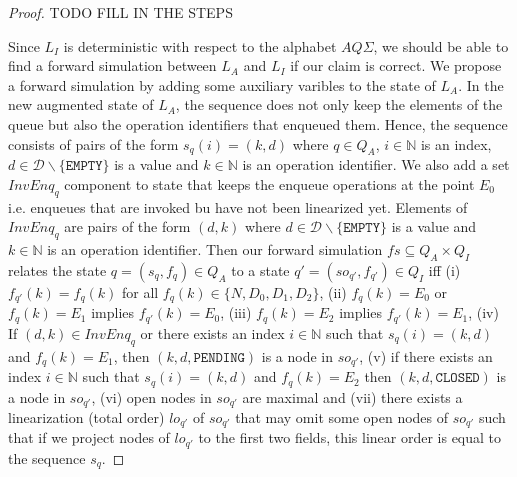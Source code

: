 \begin{proof}
TODO FILL IN THE STEPS



Since $L_I$ is deterministic with respect to the alphabet $AQ\Sigma$, we should be able to find a forward simulation between $L_A$ and $L_I$ if our claim is correct. We propose a forward simulation by adding some auxiliary varibles to the state of $L_A$. In the new augmented state of $L_A$, the sequence does not only keep the elements of the queue but also the operation identifiers that enqueued them. Hence, the sequence consists of  pairs of the form $s_q(i) = (k,d)$ where $q \in Q_A$, $i \in \mathbb{N}$ is an index, $d \in \mathcal{D}\backslash \{ \texttt{EMPTY} \}$ is a value and $k \in \mathbb{N}$ is an operation identifier. We also add a set $InvEnq_q$ component to state that keeps the enqueue operations at the point $E_0$ i.e. enqueues that are invoked bu have not been linearized yet. Elements of $InvEnq_q$ are pairs of the form $(d,k)$ where  $d \in \mathcal{D}\backslash \{ \texttt{EMPTY} \}$ is a value and $k \in \mathbb{N}$ is an operation identifier. Then our forward simulation $fs \subseteq Q_A \times Q_I$ relates the state $q = (s_q, f_q) \in Q_A$ to a state $q' =(so_{q'}, f_{q'}) \in Q_I$ iff (i) $f_{q'}(k) = f_q(k)$ for all $f_q(k) \in \{N, D_0, D_1, D_2\}$, (ii) $f_q(k) = E_0$ or $f_q(k) = E_1$ implies $f_{q'}(k) = E_0$, (iii) $f_q(k) = E_2$ implies $f_{q'}(k) = E_1$, (iv) If $(d,k) \in InvEnq_q$ or there exists an index $i \in \mathbb{N}$ such that $s_q(i) = (k,d)$ and $f_q(k) = E_1$, then $(k,d,\texttt{PENDING})$ is a node in $so_{q'}$, (v) if there exists an index $i \in \mathbb{N}$ such that $s_q(i) = (k,d)$ and $f_q(k) = E_2$ then $(k,d,\texttt{CLOSED})$ is a node in $so_{q'}$, (vi) open nodes in $so_{q'}$ are maximal and (vii) there exists a linearization (total order) $lo_{q'}$ of $so_{q'}$ that may omit some open nodes of $so_{q'}$ such that if we project nodes of
$lo_{q'}$ to the first two fields, this linear order is equal to the sequence $s_q$.


\end{proof}
